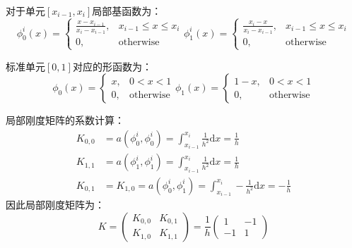 \documentclass{ctexart}
\begin{document}
对于单元$[x_{i-1}, x_i]$局部基函数为：
\begin{equation}
    \phi_0^i (x) =\begin{cases}
        \frac{x - x_{i-1}}{x_{i}- x_{i-1}}, & x_{i-1} \le x \le x_i\\
        0, & \text{otherwise}
    \end{cases}
    \phi_1^i (x) =\begin{cases}
        \frac{x_{i} - x}{x_{i}- x_{i-1}}, & x_{i-1} \le x \le x_i\\
        0, & \text{otherwise}
    \end{cases}
\end{equation}

标准单元$[0, 1]$对应的形函数为：
\begin{equation}
    \phi_0 (x) = \begin{cases}
        x, & 0 < x < 1\\
        0, & \text{otherwise}
    \end{cases}
    \phi_1 (x) = \begin{cases}
        1-x, & 0 < x < 1\\
        0, & \text{otherwise}
    \end{cases}
\end{equation}

局部刚度矩阵的系数计算：
\begin{equation}
    \begin{aligned}
        K_{0, 0} &= a(\phi_0^i, \phi_0^i) = \int_{x_{i-1}}^{x_i} \frac{1}{h^2} \mathrm dx = \frac{1}{h}\\
        K_{1, 1} &= a(\phi_1^i, \phi_1^i) = \int_{x_{i-1}}^{x_i} \frac{1}{h^2} \mathrm dx = \frac{1}{h}\\
        K_{0, 1} &= K_{1, 0} = a(\phi_0^i, \phi_1^i) = \int_{x_{i-1}}^{x_i} -\frac{1}{h^2} \mathrm dx = -\frac{1}{h}
    \end{aligned}
\end{equation}
因此局部刚度矩阵为：
\begin{equation}
    K = \begin{pmatrix}
        K_{0, 0} & K_{0, 1}\\
        K_{1, 0} & K_{1, 1}
    \end{pmatrix} = \frac{1}{h} \begin{pmatrix}
        1 & -1\\ -1 & 1
    \end{pmatrix}
\end{equation}
\end{document}
